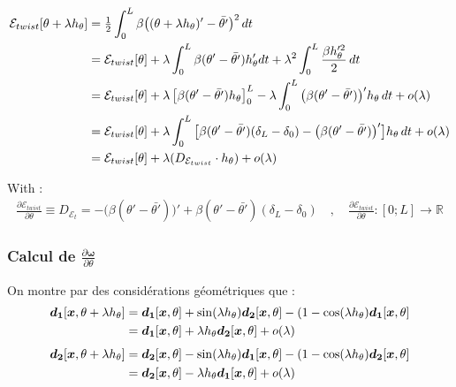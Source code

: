 \begin{align}
	\mathcal{E}_{twist}[\theta + \lambda h_{\theta}] & = \tfrac{1}{2} \int_{0}^{L} \beta\big((\theta + \lambda h_{\theta})' -{\bar{\theta'}}\big)^2 \,dt \\ 
   	& = \mathcal{E}_{twist}[\theta] + \lambda\int_{0}^{L} \beta(\theta'-{\bar{\theta'}}) h_{\theta}' dt +   \lambda^2 \int_{0}^{L} \frac{\beta h_{\theta}'^2}{2} \,dt \notag\\
	& = \mathcal{E}_{twist}[\theta] + \lambda\left[\beta(\theta'-{\bar{\theta'}}) h_{\theta}\right]_0^L - \lambda\int_{0}^{L} \big(\beta(\theta'-{\bar{\theta'}})\big)' h_{\theta}  \,dt + o(\lambda) \notag\\
	& = \mathcal{E}_{twist}[\theta] + \lambda\int_{0}^{L} \big[\beta(\theta'-{\bar{\theta'}})(\delta_L-\delta_0) - \big(\beta(\theta'-{\bar{\theta'}})\big)'\big] h_{\theta}  \,dt + o(\lambda) \notag\\
	& = \mathcal{E}_{twist}[\theta] + \lambda(D_{\mathcal{E}_{twist}} \cdot h_{\theta}) + o(\lambda) \notag
\end{align}

With :
\begin{align}
\frac{\partial \mathcal{E}_{twist}}{\partial \theta} \equiv D_{\mathcal{E}_t} = - \big(\beta(\theta'-{\bar{\theta'}})\big)' + \beta(\theta'-{\bar{\theta'}})(\delta_L-\delta_0) \quad , \quad \frac{\partial \mathcal{E}_{twist}}{\partial \theta} : [0;L] \longrightarrow 	\mathbb{R}
\end{align}



\subsubsection{Calcul de $\frac{\partial \boldsymbol{\omega}}{\partial \theta}$}

On montre par des considérations géométriques que :
\begin{align}
	\boldsymbol{d_1}[\boldsymbol{x}, \theta + \lambda h_{\theta}] & = \boldsymbol{d_1}[\boldsymbol{x}, \theta] + \sin(\lambda h_{\theta})\boldsymbol{d_2}[\boldsymbol{x}, \theta] - (1-\cos(\lambda h_{\theta})\boldsymbol{d_1}[\boldsymbol{x}, \theta] \\
   	& = \boldsymbol{d_1}[\boldsymbol{x}, \theta] + \lambda h_{\theta}\boldsymbol{d_2}[\boldsymbol{x}, \theta] + o(\lambda) \notag
\end{align}
\begin{align}
	\boldsymbol{d_2}[\boldsymbol{x}, \theta + \lambda h_{\theta}] & = \boldsymbol{d_2}[\boldsymbol{x}, \theta] - \sin(\lambda h_{\theta})\boldsymbol{d_1}[\boldsymbol{x}, \theta] - (1-\cos(\lambda h_{\theta})\boldsymbol{d_2}[\boldsymbol{x}, \theta] \\
   	& = \boldsymbol{d_2}[\boldsymbol{x}, \theta] - \lambda h_{\theta}\boldsymbol{d_1}[\boldsymbol{x}, \theta] + o(\lambda) \notag
\end{align}

